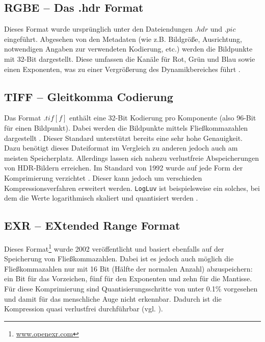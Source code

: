 \subsection{RGBE -- Das .hdr Format}

Dieses Format wurde ursprünglich unter den Dateiendungen $.hdr$ und $.pic$ eingeführt. Abgesehen von den Metadaten (wie z.B. Bildgröße, Ausrichtung, notwendigen Angaben zur verwendeten Kodierung, etc.) werden die Bildpunkte mit 32-Bit dargestellt. Diese umfassen die Kanäle für Rot, Grün und Blau sowie einen Exponenten, was zu einer Vergrößerung des Dynamikbereiches führt \cite[S. 92]{Reinhard}.

\subsection{TIFF -- Gleitkomma Codierung}
\label{sub:tiff}
Das Format $.tif[f]$ enthält eine 32-Bit Kodierung pro Komponente (also 96-Bit für einen Bildpunkt). Dabei werden die Bildpunkte mittels Fließkommazahlen dargestellt \cite{adobe:tiff}. Dieser Standard unterstützt bereits eine sehr hohe Genauigkeit. Dazu benötigt dieses Dateiformat im Vergleich zu anderen jedoch auch am meisten Speicherplatz. Allerdings lassen sich nahezu verlustfreie Abspeicherungen von \gls{HDR}-Bildern erreichen. Im Standard von 1992 wurde auf jede Form der Komprimierung verzichtet \cite[S. 93]{Reinhard}. Dieser kann jedoch um verschieden Kompressionsverfahren erweitert werden. \texttt{LogLuv} ist beispielsweise ein solches, bei dem die Werte logarithmisch skaliert und quantisiert werden \cite{logluv}. 


\subsection{EXR -- EXtended Range Format}

Dieses Format\footnote{\url{www.openexr.com}} wurde 2002 veröffentlicht und basiert ebenfalls auf der Speicherung von Fließkommazahlen. Dabei ist es jedoch auch möglich die Fließkommazahlen nur mit 16 Bit (Hälfte der normalen Anzahl) abzuspeichern: ein Bit für das Vorzeichen, fünf für den Exponenten und zehn für die Mantisse. Für diese Komprimierung sind Quantisierungsschritte von unter 0.1\% vorgesehen und damit für das menschliche Auge nicht erkennbar. Dadurch ist die Kompression quasi verlustfrei durchführbar (vgl. \cite[S. 97f]{Reinhard}).

